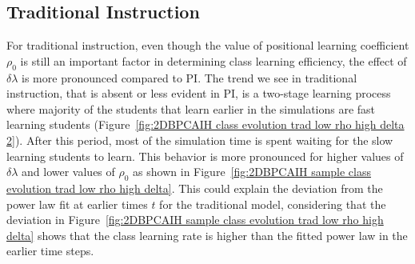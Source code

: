\subsection{Traditional Instruction}
For traditional instruction, even though the value of positional learning coefficient $\rho_0$ is still an important factor in determining class learning efficiency, the effect of $\delta\lambda$ is more pronounced compared to PI.
The trend we see in traditional instruction, that is absent or less evident in PI, is a two-stage learning process where majority of the students that learn earlier in the simulations are fast learning students (Figure~\ref{fig:2DBPCAIH class evolution trad low rho high delta 2}). 
After this period, most of the simulation time is spent waiting for the slow learning students to learn.
This behavior is more pronounced for higher values of $\delta\lambda$ and lower values of $\rho_0$ as shown in Figure~\ref{fig:2DBPCAIH sample class evolution trad low rho high delta}.
This could explain the deviation from the power law fit at earlier times $t$ for the traditional model, considering that the deviation in Figure~\ref{fig:2DBPCAIH sample class evolution trad low rho high delta} shows that the class learning rate is higher than the fitted power law in the earlier time steps.

